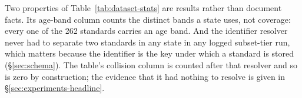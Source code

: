 Two properties of Table~\ref{tab:dataset-stats} are results rather than
document facts. Its age-band column counts the distinct bands a state uses,
not coverage: every one of the 262 standards carries an age band. And the
identifier resolver never had to separate two standards in any state in any
logged subset-tier run, which
matters because the identifier is the key under which a standard is stored
(\S\ref{sec:schema}). The table's collision column is counted after that
resolver and so is zero by construction; the evidence that it had nothing to
resolve is given in \S\ref{sec:experiments-headline}.



